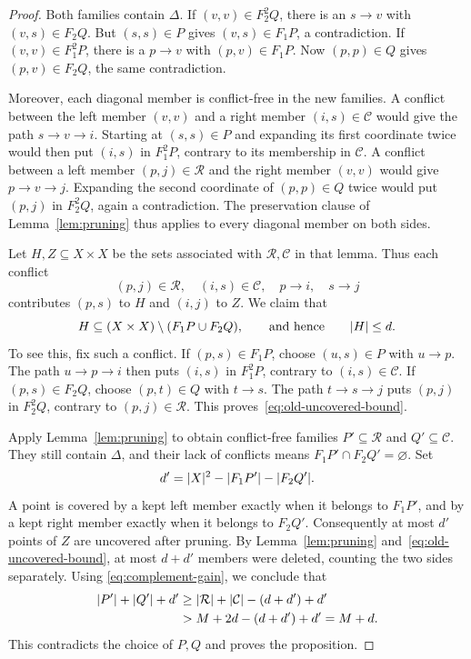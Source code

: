 \begin{proof}
Both families contain $\Delta$.  If $(v,v)\in F_2^2Q$, there is an $s\to v$
with $(v,s)\in F_2Q$.  But $(s,s)\in P$ gives $(v,s)\in F_1P$, a
contradiction.  If $(v,v)\in F_1^2P$, there is a $p\to v$ with
$(p,v)\in F_1P$.  Now $(p,p)\in Q$ gives $(p,v)\in F_2Q$, the same
contradiction.

Moreover, each diagonal member is conflict-free in the new families.
A conflict between the left member $(v,v)$ and a right member
$(i,s)\in\mathcal C$ would give the path $s\to v\to i$.
Starting at $(s,s)\in P$ and expanding its first coordinate twice would
then put $(i,s)$ in $F_1^2P$, contrary to its membership in $\mathcal C$.
A conflict between a left member $(p,j)\in\mathcal R$ and the right member
$(v,v)$ would give $p\to v\to j$.  Expanding the second coordinate of
$(p,p)\in Q$ twice would put $(p,j)$ in $F_2^2Q$, again a contradiction.
The preservation clause of Lemma~\ref{lem:pruning} thus applies to every
diagonal member on both sides.

Let $H,Z\subseteq X\times X$ be the sets associated with
$\mathcal R,\mathcal C$ in that lemma.  Thus each conflict
\[
 (p,j)\in\mathcal R,\quad (i,s)\in\mathcal C,\quad
 p\to i,\quad s\to j
\]
contributes $(p,s)$ to $H$ and $(i,j)$ to $Z$.
We claim that
\begin{equation}\label{eq:old-uncovered-bound}
 H\subseteq (X\times X)\setminus(F_1P\cup F_2Q),
 \qquad\text{and hence}\qquad \lvert H\rvert\le d.
\end{equation}
To see this, fix such a conflict.  If $(p,s)\in F_1P$, choose
$(u,s)\in P$ with $u\to p$.  The path $u\to p\to i$ then puts
$(i,s)$ in $F_1^2P$, contrary to $(i,s)\in\mathcal C$.
If $(p,s)\in F_2Q$, choose $(p,t)\in Q$ with $t\to s$.
The path $t\to s\to j$ puts $(p,j)$ in $F_2^2Q$, contrary to
$(p,j)\in\mathcal R$.  This proves~\eqref{eq:old-uncovered-bound}.

Apply Lemma~\ref{lem:pruning} to obtain conflict-free families
$P'\subseteq\mathcal R$ and $Q'\subseteq\mathcal C$.
They still contain $\Delta$, and their lack of conflicts means
$F_1P'\cap F_2Q'=\varnothing$.  Set
\[
 d'=\lvert X\rvert^2-\lvert F_1P'\rvert-\lvert F_2Q'\rvert.
\]
A point is covered by a kept left member exactly when it belongs to
$F_1P'$, and by a kept right member exactly when it belongs to $F_2Q'$.
Consequently at most $d'$ points of $Z$ are uncovered after pruning.
By Lemma~\ref{lem:pruning} and~\eqref{eq:old-uncovered-bound}, at most $d+d'$ members
were deleted, counting the two sides separately.  Using
\eqref{eq:complement-gain}, we conclude that
\[
 \begin{aligned}
 \lvert P'\rvert+\lvert Q'\rvert+d'
 &\ge \lvert \mathcal R\rvert+\lvert \mathcal C\rvert-(d+d')+d'\\
 &>M+2d-(d+d')+d'=M+d.
 \end{aligned}
\]
This contradicts the choice of $P,Q$ and proves the proposition.
\end{proof}

